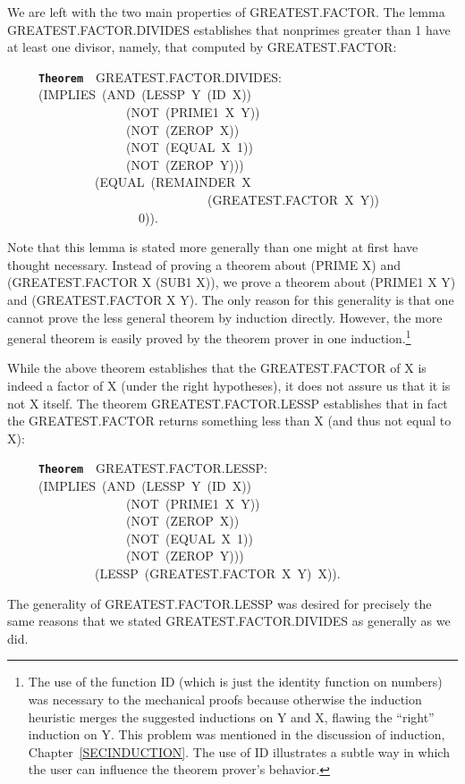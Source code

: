 \documentclass[11pt]{book}
\newenvironment{pubasis}{\begin{flushleft}\ttfamily\small}{\normalsize\rmfamily\end{flushleft}}
\newcommand{\axiomordefinition}[1]{\vspace{6pt}\texttt{\textbf{#1}}}
\begin{document}
We are left with the two main properties of GREAT\-EST.FAC\-TOR.
The lemma GREAT\-EST.FAC\-TOR.DIVIDES establishes that nonprimes greater than 1 have at least
one divisor, namely, that computed by GREAT\-EST.FAC\-TOR:
\begin{pubasis}
~~~~~\axiomordefinition{Theorem}~~GREAT\-EST.FAC\-TOR.DIVIDES:\\
~~~~~(IMPLIES~(AND~(LESSP~Y~(ID~X))\\
~~~~~~~~~~~~~~~~~~~(NOT~(PRIME1~X~Y))\\
~~~~~~~~~~~~~~~~~~~(NOT~(ZEROP~X))\\
~~~~~~~~~~~~~~~~~~~(NOT~(EQUAL~X~1))\\
~~~~~~~~~~~~~~~~~~~(NOT~(ZEROP~Y)))\\
~~~~~~~~~~~~~~(EQUAL~(REMAINDER~X\\
~~~~~~~~~~~~~~~~~~~~~~~~~~~~~~~~(GREAT\-EST.FAC\-TOR~X~Y))\\
~~~~~~~~~~~~~~~~~~~~~0)).\\
\end{pubasis}
Note that this lemma is stated more generally than
one might at first have thought necessary.  Instead
of proving a theorem about (PRIME X) and (GREAT\-EST.FAC\-TOR X (SUB1 X)),
we prove a theorem about (PRIME1 X Y) and
(GREAT\-EST.FAC\-TOR X Y).  The only reason for this
generality is that one cannot prove the less
general theorem by induction directly.  However,
the more general theorem is easily proved by
the theorem prover in one induction.\footnote{The use of the function ID (which is just the identity function on numbers) was necessary to the mechanical proofs because otherwise the induction heuristic merges the suggested inductions on Y and X, flawing the ``right'' induction on Y.  This problem was mentioned in the discussion of induction, Chapter~\ref{SECINDUCTION}. The use of ID illustrates a subtle way in which the user can influence the theorem prover's behavior.}

While the above theorem establishes that the
GREAT\-EST.FAC\-TOR of X is indeed a factor of X (under the right hypotheses),
it does not assure us that it is not X itself.  The theorem
GREAT\-EST.FAC\-TOR.LESSP establishes that in fact the GREAT\-EST.FAC\-TOR
returns something less than X (and thus not equal to X):
\begin{pubasis}
~~~~~\axiomordefinition{Theorem}~~GREAT\-EST.FAC\-TOR.LESSP:\\
~~~~~(IMPLIES~(AND~(LESSP~Y~(ID~X))\\
~~~~~~~~~~~~~~~~~~~(NOT~(PRIME1~X~Y))\\
~~~~~~~~~~~~~~~~~~~(NOT~(ZEROP~X))\\
~~~~~~~~~~~~~~~~~~~(NOT~(EQUAL~X~1))\\
~~~~~~~~~~~~~~~~~~~(NOT~(ZEROP~Y)))\\
~~~~~~~~~~~~~~(LESSP~(GREAT\-EST.FAC\-TOR~X~Y)~X)).\\
\end{pubasis}
The generality of GREAT\-EST.FAC\-TOR.LESSP was desired
for precisely the same reasons that we stated
GREAT\-EST.FAC\-TOR.DIVIDES as generally as we did.
\end{document}
